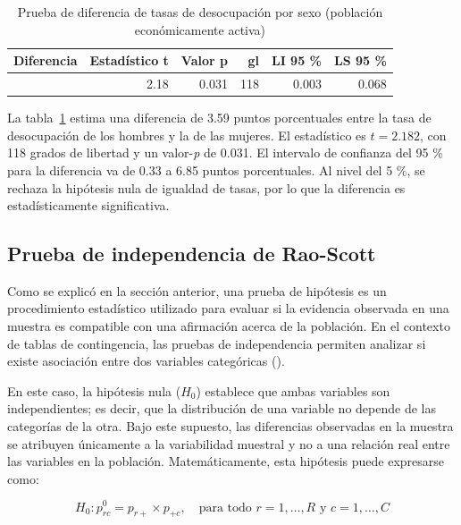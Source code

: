 \documentclass[
  spanish,
  11pt,
  letterpaper,
  oneside,
  open=any]{scrbook}
\begin{document}
{

\begin{longtable}[]{@{}rrrrrr@{}}

\caption{\label{tbl-ttest-desocupacion-sexo}Prueba de diferencia de
tasas de desocupación por sexo (población económicamente activa)}

\tabularnewline

\toprule\noalign{}
Diferencia & Estadístico t & Valor p & gl & LI 95 \% & LS 95 \% \\
\midrule\noalign{}
\endhead
\bottomrule\noalign{}
\endlastfoot
0.036 & 2.18 & 0.031 & 118 & 0.003 & 0.068 \\

\end{longtable}

}

La tabla~\ref{tbl-ttest-desocupacion-sexo} estima una diferencia de 3.59
puntos porcentuales entre la tasa de desocupación de los hombres y la de
las mujeres. El estadístico es \(t = 2.182\), con 118 grados de libertad
y un valor-\emph{p} de 0.031. El intervalo de confianza del 95 \% para
la diferencia va de 0.33 a 6.85 puntos porcentuales. Al nivel del 5 \%,
se rechaza la hipótesis nula de igualdad de tasas, por lo que la
diferencia es estadísticamente significativa.

\subsection{Prueba de independencia de
Rao-Scott}\label{prueba-de-independencia-chi}

Como se explicó en la sección anterior, una prueba de hipótesis es un
procedimiento estadístico utilizado para evaluar si la evidencia
observada en una muestra es compatible con una afirmación acerca de la
población. En el contexto de tablas de contingencia, las pruebas de
independencia permiten analizar si existe asociación entre dos variables
categóricas ().

En este caso, la hipótesis nula (\(H_{0}\)) establece que ambas
variables son independientes; es decir, que la distribución de una
variable no depende de las categorías de la otra. Bajo este supuesto,
las diferencias observadas en la muestra se atribuyen únicamente a la
variabilidad muestral y no a una relación real entre las variables en la
población. Matemáticamente, esta hipótesis puede expresarse como:

\[
H_0: p_{rc}^0 = p_{r+} \times p_{+c}, \quad \text{para todo } r = 1,\ldots,R \text{ y } c = 1,\ldots,C
\]
\end{document}
